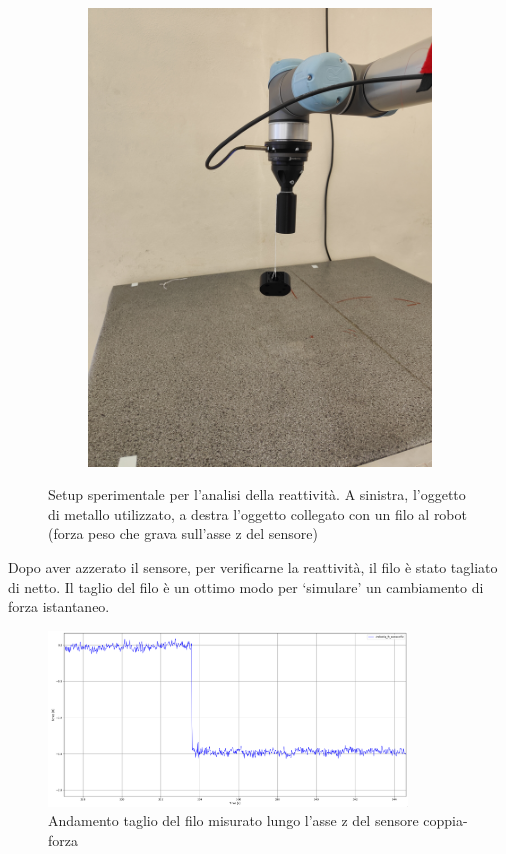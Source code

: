 \begin{figure}[H]
\begin{subfigure}[b]{0.4\textwidth}
        \label{fig:object}
    \end{subfigure}
    \qquad
    \begin{subfigure}[b]{0.4\textwidth}
        \includegraphics[width=\textwidth]{images/setup_z.jpg}
        \label{fig:setup}
    \end{subfigure}
    \caption{Setup sperimentale per l'analisi della reattivit\`{a}. A sinistra, l'oggetto di metallo utilizzato, 
    a destra l'oggetto collegato con un filo al robot (forza peso che grava sull'asse z del sensore)}\label{fig:setup_z}
\end{figure}
Dopo aver azzerato il sensore, per verificarne la reattivit\`{a}, il filo \`{e} stato tagliato di netto. 
Il taglio del filo \`{e} un ottimo modo per `simulare' un cambiamento di forza istantaneo.
\begin{figure}[H]
    \centering
    \includegraphics*[width=0.85\textwidth]{images/z_cut.png}
    \caption{Andamento taglio del filo misurato lungo l'asse z del sensore coppia-forza}
    \label{fig:z_cut}
\end{figure}
